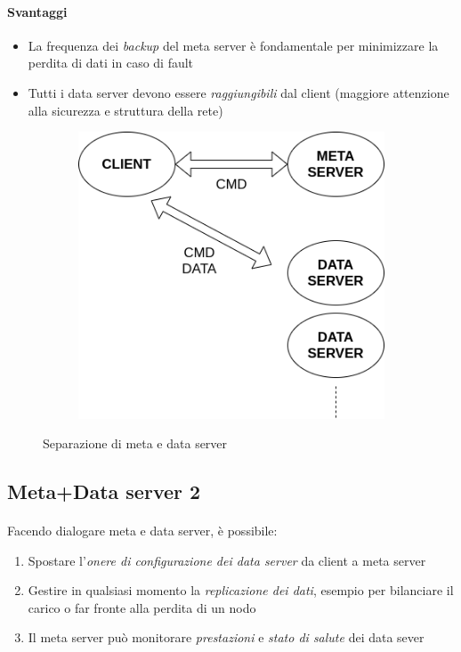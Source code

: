\documentclass{article}
\begin{document}
\paragraph{Svantaggi} \begin{itemize}
	\item La frequenza dei \emph{backup} del meta server è fondamentale per minimizzare la perdita di dati in caso di fault
	\item Tutti i data server devono essere \emph{raggiungibili} dal client (maggiore attenzione alla sicurezza e struttura della rete)
\end{itemize}

\begin{figure}[H]
	\centering
	\begin{subfigure}{0.60\linewidth}
		\includegraphics[width=\linewidth]{../diagrams/architettura/5.png}
	\end{subfigure}
	\caption{Separazione di meta e data server}
\end{figure}



\subsection{Meta+Data server 2}

\paragraph{} Facendo dialogare meta e data server, è possibile:\begin{enumerate}
	\item Spostare l'\emph{onere di configurazione dei data server} da client a meta server
	\item Gestire in qualsiasi momento la \emph{replicazione dei dati}, esempio per bilanciare il carico o far fronte alla perdita di un nodo
	\item Il meta server può monitorare \emph{prestazioni} e \emph{stato di salute} dei data sever
\end{enumerate}
\end{document}
